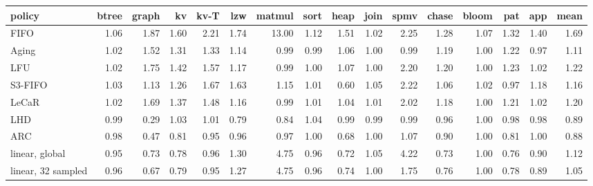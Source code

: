 \begin{tabular}{lrrrrrrrrrrrrrrr}
\toprule
policy & btree & graph & kv & kv-T & lzw & matmul & sort & heap & join & spmv & chase & bloom & pat & app & mean \\
\midrule
FIFO & 1.06 & 1.87 & 1.60 & 2.21 & 1.74 & 13.00 & 1.12 & 1.51 & 1.02 & 2.25 & 1.28 & 1.07 & 1.32 & 1.40 & 1.69 \\
Aging & 1.02 & 1.52 & 1.31 & 1.33 & 1.14 & 0.99 & 0.99 & 1.06 & 1.00 & 0.99 & 1.19 & 1.00 & 1.22 & 0.97 & 1.11 \\
LFU & 1.02 & 1.75 & 1.42 & 1.57 & 1.17 & 0.99 & 1.00 & 1.07 & 1.00 & 2.20 & 1.20 & 1.00 & 1.23 & 1.02 & 1.22 \\
S3-FIFO & 1.03 & 1.13 & 1.26 & 1.67 & 1.63 & 1.15 & 1.01 & 0.60 & 1.05 & 2.22 & 1.06 & 1.02 & 0.97 & 1.18 & 1.16 \\
LeCaR & 1.02 & 1.69 & 1.37 & 1.48 & 1.16 & 0.99 & 1.01 & 1.04 & 1.01 & 2.02 & 1.18 & 1.00 & 1.21 & 1.02 & 1.20 \\
LHD & 0.99 & 0.29 & 1.03 & 1.01 & 0.79 & 0.84 & 1.04 & 0.99 & 0.99 & 0.99 & 0.96 & 1.00 & 0.98 & 0.98 & 0.89 \\
ARC & 0.98 & 0.47 & 0.81 & 0.95 & 0.96 & 0.97 & 1.00 & 0.68 & 1.00 & 1.07 & 0.90 & 1.00 & 0.81 & 1.00 & 0.88 \\
linear, global & 0.95 & 0.73 & 0.78 & 0.96 & 1.30 & 4.75 & 0.96 & 0.72 & 1.05 & 4.22 & 0.73 & 1.00 & 0.76 & 0.90 & 1.12 \\
linear, 32 sampled & 0.96 & 0.67 & 0.79 & 0.95 & 1.27 & 4.75 & 0.96 & 0.74 & 1.00 & 1.75 & 0.76 & 1.00 & 0.78 & 0.89 & 1.05 \\
\bottomrule
\end{tabular}
